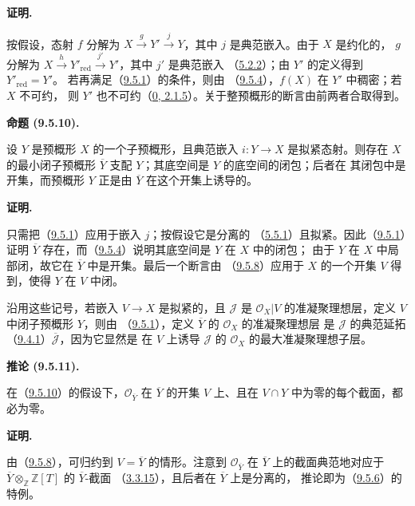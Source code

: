 \documentclass[UTF8,fontset=none,11pt,oneside,openany]{ctexbook}
\newenvironment{proposition}[1][]{%
  \par\medskip\noindent\textbf{命题 (#1).}\ %
}{\par}
\newenvironment{corollary}[1][]{%
  \par\medskip\noindent\textbf{推论 (#1).}\ %
}{\par}
\newenvironment{proof}{%
  \par\medskip\noindent\textbf{证明.}\ %
}{\par}
\newcommand{\oldpage}[2][]{%
  \hypertarget{ega-source-page-#1-#2}{}%
  \marginnote{\scriptsize\textbf{#1}~|~#2}\ignorespaces}
\let\EGAOriginalLabel\label
\renewcommand{\label}[1]{\phantomsection\EGAOriginalLabel{#1}}
\begin{document}
\begin{proof}
按假设，态射 $f$ 分解为
$X\xrightarrow{g}Y'\xrightarrow{j}Y$，其中 $j$ 是典范嵌入。由于 $X$ 是约化的，
$g$ 分解为
$X\xrightarrow{h}Y'_{\mathrm{red}}\xrightarrow{j'}Y'$，其中 $j'$ 是典范嵌入
（\hyperref[I.5.2.2-fr]{5.2.2}）；由 $Y'$ 的定义得到 $Y'_{\mathrm{red}}=Y'$。
若再满足（\hyperref[I.9.5.1-fr]{9.5.1}）的条件，则由
（\hyperref[I.9.5.4-fr]{9.5.4}），$f(X)$ 在 $Y'$ 中稠密；若 $X$ 不可约，
则 $Y'$ 也不可约（\hyperref[0.2.1.5-fr]{0, 2.1.5}）。关于整预概形的断言由前两者合取得到。
\end{proof}

\begin{proposition}[9.5.10]
\label{I.9.5.10-fr}
设 $Y$ 是预概形 $X$ 的一个子预概形，且典范嵌入 $i:Y\to X$ 是拟紧态射。则存在
$X$ 的最小闭子预概形 $\overline{Y}$ 支配 $Y$；其底空间是 $Y$ 的底空间的闭包；后者在
其闭包中是开集，而预概形 $Y$ 正是由 $\overline{Y}$ 在这个开集上诱导的。
\end{proposition}

\begin{proof}
只需把（\hyperref[I.9.5.1-fr]{9.5.1}）应用于嵌入 $j$；按假设它是分离的
（\hyperref[I.5.5.1-fr]{5.5.1}）且拟紧。因此（\hyperref[I.9.5.1-fr]{9.5.1}）证明
$\overline{Y}$ 存在，而（\hyperref[I.9.5.4-fr]{9.5.4}）说明其底空间是 $Y$ 在 $X$ 中的闭包；
由于 $Y$ 在 $X$ 中局部闭，故它在 $\overline{Y}$ 中是开集。最后一个断言由
（\hyperref[I.9.5.8-fr]{9.5.8}）应用于 $X$ 的一个开集 $V$ 得到，使得 $Y$ 在 $V$ 中闭。
\end{proof}

沿用这些记号，若嵌入 $V\to X$ 是拟紧的，且 $\mathscr{J}$ 是
$\mathscr{O}_X|V$ 的准凝聚理想层，定义 $V$ 中闭子预概形 $Y$，则由
（\hyperref[I.9.5.1-fr]{9.5.1}），定义 $\overline{Y}$ 的 $\mathscr{O}_X$ 的准凝聚理想层
是 $\mathscr{J}$ 的典范延拓
（\hyperref[I.9.4.1-fr]{9.4.1}）$\overline{\mathscr{J}}$，因为它显然是
在 $V$ 上诱导 $\mathscr{J}$ 的 $\mathscr{O}_X$ 的最大准凝聚理想子层。
\oldpage[I]{179}
\begin{corollary}[9.5.11]
\label{I.9.5.11-fr}
在（\hyperref[I.9.5.10-fr]{9.5.10}）的假设下，$\mathscr{O}_{\overline{Y}}$ 在
$\overline{Y}$ 的开集 $V$ 上、且在 $V\cap Y$ 中为零的每个截面，都必为零。
\end{corollary}

\begin{proof}
由（\hyperref[I.9.5.8-fr]{9.5.8}），可归约到 $V=\overline{Y}$ 的情形。注意到
$\mathscr{O}_{\overline{Y}}$ 在 $\overline{Y}$ 上的截面典范地对应于
$\overline{Y}\otimes_{\mathbb{Z}}\mathbb{Z}[T]$ 的 $\overline{Y}$-截面
（\hyperref[I.3.3.15-fr]{3.3.15}），且后者在 $\overline{Y}$ 上是分离的，
推论即为（\hyperref[I.9.5.6-fr]{9.5.6}）的特例。
\end{proof}
\end{document}
